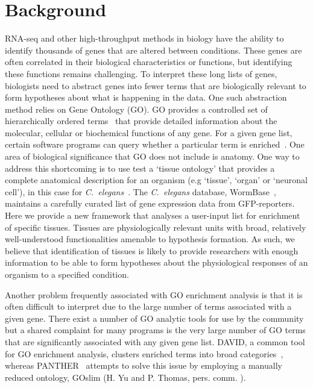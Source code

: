 \documentclass{bmcart}
\begin{document}
\section*{Background}
	RNA-seq and other high-throughput methods in biology have the ability to identify thousands of genes that are altered between conditions. These genes are often correlated in their biological characteristics or functions, but identifying these functions remains challenging. To interpret these long lists of genes, biologists need to abstract genes into fewer terms that are biologically relevant to form hypotheses about what is happening in the data. One such abstraction method relies on Gene Ontology (GO). GO provides a controlled set of hierarchically ordered terms~\cite{TheGeneOntologyConsortium2000a, TheGeneOntologyConsortium2015} that provide detailed information about the molecular, cellular or biochemical functions of any gene. For a given gene list, certain software programs can query whether a particular term is enriched~\cite{Mi2009, McLean2010, Huang2009}. One area of biological significance that GO does not include is anatomy. One way to address this shortcoming is to use test a `tissue ontology' that provides a complete anatomical description for an organism (e.g `tissue', `organ' or `neuronal cell'), in this case for \emph{C.~elegans}~\cite{Lee2003}. The \emph{C.~elegans} database, WormBase~\cite{Harris2014}, maintains a carefully curated list of gene expression data from GFP-reporters. Here we provide a new framework that analyses a user-input list for enrichment of specific tissues. Tissues are physiologically relevant units with broad, relatively well-understood functionalities amenable to hypothesis formation. As such, we believe that identification of tissues is likely to provide researchers with enough information to be able to form hypotheses about the physiological responses of an organism to a specified condition.

Another problem frequently associated with GO enrichment analysis is that it is often difficult to interpret due to the large number of terms associated with a given gene. There exist a number of GO analytic tools for use by the community but a shared complaint for many programs is the very large number of GO terms that are significantly associated with any given gene list. DAVID, a common tool for GO enrichment analysis, clusters enriched terms into broad categories~\cite{Huang2007}, whereas PANTHER~\cite{Mi2009, Mi2013} attempts to solve this issue by employing a manually reduced ontology, GOslim (H. Yu and P. Thomas, pers. comm. ). 
\end{document}
